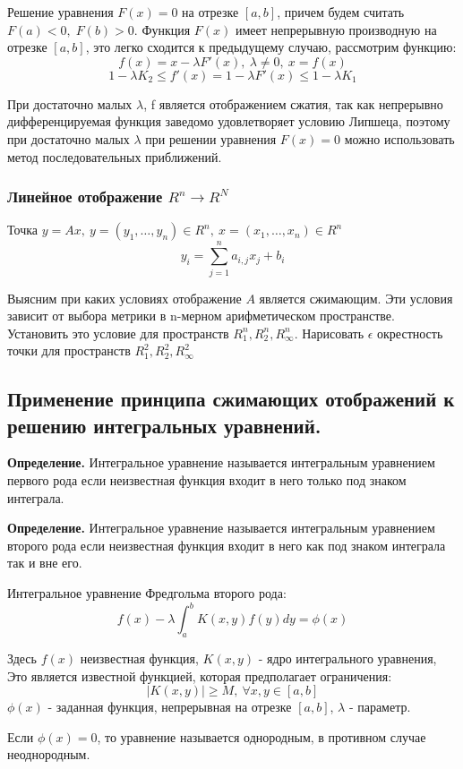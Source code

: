 \documentclass[14pt]{extarticle}
\theoremstyle{definition}
\theoremstyle{remark}
\renewcommand{\[}{\begin{dmath*}[compact]}
\renewcommand{\]}{\end{dmath*}}
\newcommand{\sep}{ , \ \allowbreak }
\newcommand{\tdef}{\textbf{Определение.} }
\begin{document}
Решение уравнения $F(x)=0$ на отрезке $[a,b]$, причем будем считать
$F(a)<0,\; F(b)>0$.
Функция $F(x)$ имеет непрерывную производную на отрезке $[a,b]$, это легко сходится к предыдущему случаю, рассмотрим функцию:
\[ f(x)=x-\lambda F'(x)\sep \lambda \neq 0 \sep {x=f(x)}\]
\[ 1 - \lambda K_2 \leq f'(x) = 1 - \lambda F'(x) \leq 1 - \lambda K_1\]

При достаточно малых $\lambda$, f является отображением сжатия, так как непрерывно дифференцируемая функция заведомо удовлетворяет условию Липшеца, поэтому при достаточно малых $\lambda$ при решении уравнения $F(x)=0$ можно использовать метод последовательных приближений.

\subsubsection{Линейное отображение $R^n \to R^N$}

Точка $y=Ax\sep y=(y_1,\dots,y_n) \in R^n\sep x=(x_1,\dots,x_n) \in R^n$
\[ y_i=\sum_{j=1}^n a_{i,j}x_j+b_i\]

Выясним при каких условиях отображение $A$ является сжимающим. Эти условия зависит от выбора метрики в n-мерном арифметическом пространстве. Установить это условие для пространств $R_1^n,R_2^n,R_\infty^n$. Нарисовать $\epsilon$ окрестность точки для пространств $R_1^2,R_2^2,R_\infty^2$

\subsection{Применение принципа сжимающих отображений к решению интегральных уравнений.}

\tdef Интегральное уравнение называется интегральным уравнением первого рода если неизвестная функция входит в него только под знаком интеграла.

\tdef Интегральное уравнение называется интегральным уравнением второго рода если неизвестная функция входит в него как под знаком интеграла так и вне его.

Интегральное уравнение Фредгольма второго рода:
\[ f(x)-\lambda\int_a^bK(x,y)f(y)dy=\phi(x)\]

Здесь $f(x)$ неизвестная функция, $K(x,y)$ - ядро интегрального уравнения, Это является известной функцией, которая предполагает ограничения:
\[ |K(x,y)|\geq M\sep\forall x,y\in[a,b]\]
$\phi(x)$ - заданная функция, непрерывная на отрезке $[a,b]$, $\lambda$ - параметр.

Если $\phi(x) = 0$, то уравнение называется однородным, в противном случае неоднородным.
\end{document}
